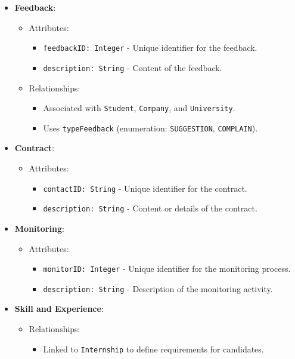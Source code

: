 \begin{itemize}
    \item \textbf{Feedback}:
    \begin{itemize}
        \item Attributes:
        \begin{itemize}
            \item \texttt{feedbackID: Integer} - Unique identifier for the feedback.
            \item \texttt{description: String} - Content of the feedback.
        \end{itemize}
        \item Relationships:
        \begin{itemize}
            \item Associated with \texttt{Student}, \texttt{Company}, and \texttt{University}.
            \item Uses \texttt{typeFeedback} (enumeration: \texttt{SUGGESTION}, \texttt{COMPLAIN}).
        \end{itemize}
    \end{itemize}

    \item \textbf{Contract}:
    \begin{itemize}
        \item Attributes:
        \begin{itemize}
            \item \texttt{contactID: String} - Unique identifier for the contract.
            \item \texttt{description: String} - Content or details of the contract.
        \end{itemize}
    \end{itemize}

    \item \textbf{Monitoring}:
    \begin{itemize}
        \item Attributes:
        \begin{itemize}
            \item \texttt{monitorID: Integer} - Unique identifier for the monitoring process.
            \item \texttt{description: String} - Description of the monitoring activity.
        \end{itemize}
    \end{itemize}

    \item \textbf{Skill and Experience}:
    \begin{itemize}
        \item Relationships:
        \begin{itemize}
            \item Linked to \texttt{Internship} to define requirements for candidates.
        \end{itemize}
    \end{itemize}


\end{itemize}

